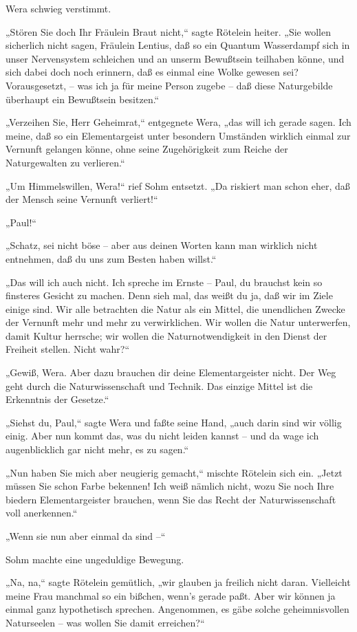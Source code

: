 Wera schwieg verstimmt.

„Stören Sie doch Ihr Fräulein Braut nicht,“ sagte Rötelein heiter.
„Sie wollen sicherlich nicht sagen, Fräulein Lentius, daß so ein
Quantum Wasserdampf sich in unser Nervensystem schleichen und an
unserm Bewußtsein teilhaben könne, und sich dabei doch noch
erinnern, daß es einmal eine Wolke gewesen sei? Vorausgesetzt, –
was ich ja für meine Person zugebe – daß diese Naturgebilde
überhaupt ein Bewußtsein besitzen.“

„Verzeihen Sie, Herr Geheimrat,“ entgegnete Wera, „das will ich
gerade sagen. Ich meine, daß so ein Elementargeist unter besondern
Umständen wirklich einmal zur Vernunft gelangen könne, ohne seine
Zugehörigkeit zum Reiche der Naturgewalten zu verlieren.“

„Um Himmelswillen, Wera!“ rief Sohm entsetzt. „Da riskiert man
schon eher, daß der Mensch seine Vernunft verliert!“

„Paul!“

„Schatz, sei nicht böse – aber aus deinen Worten kann man wirklich
nicht entnehmen, daß du uns zum Besten haben willst.“

„Das will ich auch nicht. Ich spreche im Ernste – Paul, du brauchst
kein so finsteres Gesicht zu machen. Denn sieh mal, das weißt du
ja, daß wir im Ziele einige sind. Wir alle betrachten die Natur als
ein Mittel, die unendlichen Zwecke der Vernunft mehr und mehr zu
verwirklichen. Wir wollen die Natur unterwerfen, damit Kultur
herrsche; wir wollen die Naturnotwendigkeit in den Dienst der
Freiheit stellen. Nicht wahr?“

„Gewiß, Wera. Aber dazu brauchen dir deine Elementargeister nicht.
Der Weg geht durch die Naturwissenschaft und Technik. Das einzige
Mittel ist die Erkenntnis der Gesetze.“

„Siehst du, Paul,“ sagte Wera und faßte seine Hand, „auch darin
sind wir völlig einig. Aber nun kommt das, was du nicht leiden
kannst – und da wage ich augenblicklich gar nicht mehr, es zu
sagen.“

„Nun haben Sie mich aber neugierig gemacht,“ mischte Rötelein sich
ein. „Jetzt müssen Sie schon Farbe bekennen! Ich weiß nämlich
nicht, wozu Sie noch Ihre biedern Elementargeister brauchen, wenn
Sie das Recht der Naturwissenschaft voll anerkennen.“

„Wenn sie nun aber einmal da sind –“

Sohm machte eine ungeduldige Bewegung.

„Na, na,“ sagte Rötelein gemütlich, „wir glauben ja freilich nicht
daran. Vielleicht meine Frau manchmal so ein bißchen, wenn's gerade
paßt. Aber wir können ja einmal ganz hypothetisch sprechen.
Angenommen, es gäbe solche geheimnisvollen Naturseelen – was wollen
Sie damit erreichen?“


